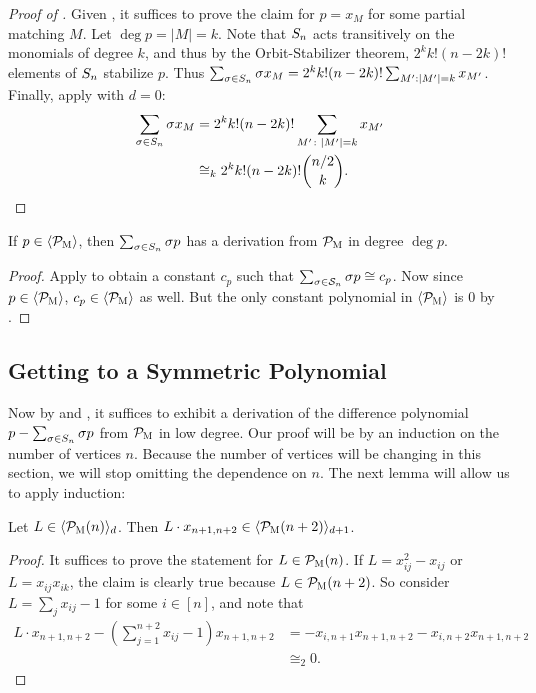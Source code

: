 \begin{proof}[Proof of ]
Given ,
it suffices to prove the claim for
\(p = x_{M}\) for some partial matching \(M\).
Let $\deg p = |M| = k$.
Note that $S_{n}$ acts transitively on the monomials of degree $k$, and thus by the Orbit-Stabilizer theorem, $2^k k! (n-2k)!$ elements of $S_{n}$ stabilize $p$.
Thus $\sum_{\sigma \in S_{n}} \sigma x_M = 2^k k! (n-2k)!\sum_{M': |M'| = k} x_{M'}$.
Finally, apply  with $d = 0$:
\begin{equation*}
  \begin{split}
  \sum_{\sigma \in S_{n}} \sigma x_{M}
  &= 2^{k} k! (n-2k)! \sum_{M' \colon \left|M'\right| = k} x_{M'} \\
  &\cong_k
  2^{k} k! (n-2k)! \binom{n/2}{k}.
  \end{split}
\end{equation*}
\end{proof}
\begin{corollary}\label{cor:constantiszero}
If $p \in \langle \mathcal P_{\textsc{M}} \rangle$, then $\sum_{\sigma \in S_{n}} \sigma p$ has a derivation from $\mathcal P_{\textsc{M}}$ in degree $\deg p$.
\end{corollary}
\begin{proof}
Apply  to obtain a constant $c_p$ such that $\sum_{\sigma \in \mathcal S_n} \sigma p \cong c_p$. 
Now since $p \in \langle \mathcal P_{\textsc{M}} \rangle$, $c_p \in \langle \mathcal P_{\textsc{M}} \rangle$ as well. But the only constant polynomial in $\langle \mathcal P_{\textsc{M}} \rangle$ is $0$ by .
\end{proof}

\subsection{Getting to a Symmetric Polynomial}
Now by  and , it suffices to exhibit a derivation of the difference polynomial $p - \sum_{\sigma \in S_{n}} \sigma p$ from $\mathcal P_{\textsc{M}}$ in low degree. Our proof will be by an induction on the number of vertices $n$. Because the number of vertices will be changing in this section, we will stop omitting the dependence on $n$.
The next lemma will allow us to apply induction:
\begin{lemma}
  \label{lem:degree-increase}
  Let \(L \in \langle \mathcal P_{\textsc{M}}(n) \rangle_d\).
	Then $L \cdot x_{n+1,n+2} \in \langle \mathcal P_{\textsc{M}}(n+2) \rangle_{d+1}$.
\end{lemma}
\begin{proof}
It suffices to prove the statement for $L \in \mathcal P_{\textsc{M}}(n)$. 
If $L = x_{ij}^2 - x_{ij}$ or $L = x_{ij}x_{ik}$, the claim is clearly true because $L \in \mathcal P_{\textsc{M}}(n+2)$.
So consider $L = \sum_j x_{ij} - 1$ for some $i \in [n]$, and note that 
\begin{align*}
L\cdot x_{n+1,n+2} - \left(\sum_{j=1}^{n+2} x_{ij} - 1\right)x_{n+1,n+2} &= -x_{i,n+1}x_{n+1,n+2} - x_{i,n+2}x_{n+1,n+2} \\
&\cong_2 0.
\end{align*}
\end{proof}

